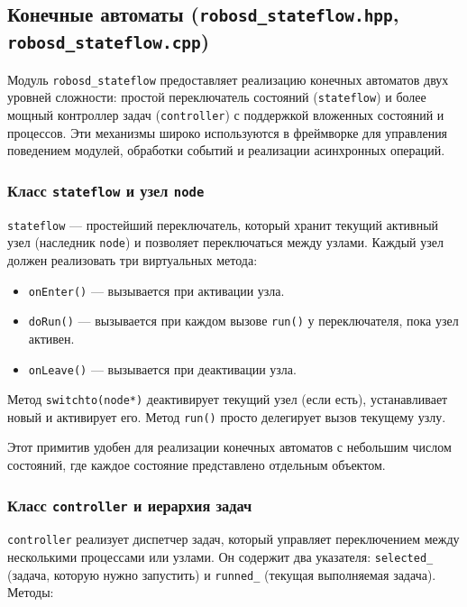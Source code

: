 \documentclass[a4paper,12pt]{article}
\begin{document}
\subsection{Конечные автоматы (\texttt{robosd\_stateflow.hpp}, \texttt{robosd\_stateflow.cpp})}

Модуль \texttt{robosd\_stateflow} предоставляет реализацию конечных автоматов двух уровней сложности: простой переключатель состояний (\texttt{stateflow}) и более мощный контроллер задач (\texttt{controller}) с поддержкой вложенных состояний и процессов. Эти механизмы широко используются в фреймворке для управления поведением модулей, обработки событий и реализации асинхронных операций.

\subsubsection{Класс \texttt{stateflow} и узел \texttt{node}}

\texttt{stateflow} — простейший переключатель, который хранит текущий активный узел (наследник \texttt{node}) и позволяет переключаться между узлами. Каждый узел должен реализовать три виртуальных метода:

\begin{itemize}
    \item \texttt{onEnter()} — вызывается при активации узла.
    \item \texttt{doRun()} — вызывается при каждом вызове \texttt{run()} у переключателя, пока узел активен.
    \item \texttt{onLeave()} — вызывается при деактивации узла.
\end{itemize}

Метод \texttt{switchto(node*)} деактивирует текущий узел (если есть), устанавливает новый и активирует его. Метод \texttt{run()} просто делегирует вызов текущему узлу.

Этот примитив удобен для реализации конечных автоматов с небольшим числом состояний, где каждое состояние представлено отдельным объектом.

\subsubsection{Класс \texttt{controller} и иерархия задач}

\texttt{controller} реализует диспетчер задач, который управляет переключением между несколькими процессами или узлами. Он содержит два указателя: \texttt{selected\_} (задача, которую нужно запустить) и \texttt{runned\_} (текущая выполняемая задача). Методы:
\end{document}
